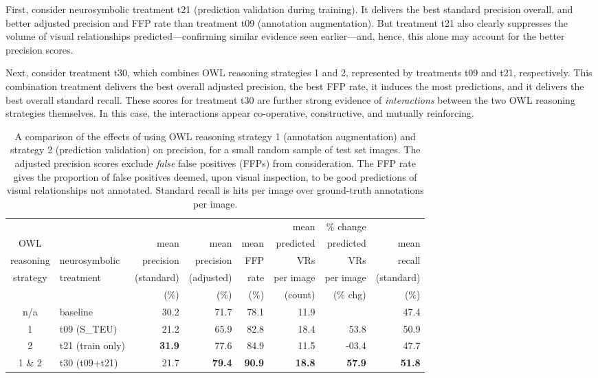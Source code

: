 \documentclass[]{jair}
\begin{document}
First, consider neurosymbolic treatment t21 (prediction validation during training).
It delivers the best standard precision overall, and better adjusted precision and FFP rate than treatment t09 (annotation augmentation).
But treatment t21 also clearly suppresses the volume of visual relationships predicted---confirming similar evidence seen earlier---and, hence, this alone may account for the better precision scores.

Next, consider treatment t30, which combines OWL reasoning strategies 1 and 2, represented by treatments t09 and t21, respectively.
This combination treatment delivers the best overall adjusted precision, the best FFP rate, it induces the most predictions, and it delivers the best overall standard recall.
These scores for treatment t30 are further strong evidence of \emph{interactions} between the two OWL reasoning strategies themselves.
In this case, the interactions appear co-operative, constructive, and mutually reinforcing.

\begin{table}[t]
  \centering
  \footnotesize
  \begin{threeparttable}
  \caption{\footnotesize A comparison of the effects of using OWL reasoning strategy 1 (annotation augmentation) and strategy 2 (prediction validation) on precision, for a small random sample of test set images. The adjusted precision scores exclude \emph{false} false positives (FFPs) from consideration. The FFP rate gives the proportion of false positives deemed, upon visual inspection, to be good predictions of visual relationships not annotated. Standard recall is hits per image over ground-truth annotations per image.}
  \label{table:manual-precision-scores-I2}
  \begin{tabular}{clrrrrrr}
    \toprule
            &       &            &            &        & mean   & \% change &   \\
    OWL     &       & mean       & mean       & mean       & predicted   & predicted & mean \\
    reasoning & neurosymbolic   & precision  & precision  &    FFP  &   VRs & VRs & recall \\
    strategy  & treatment & (standard)  & (adjusted) & rate  & per image & per image & (standard) \\
            & & (\%)   &  (\%)  & (\%) & (count) & (\% chg) & (\%) \\
    \midrule
    n/a    & baseline & 30.2  & 71.7  & 78.1 & 11.9 &  & 47.4 \\
    1 & t09 (S\_TEU) & 21.2  & 65.9  & 82.8 & 18.4 & 53.8 & 50.9 \\
    2 & t21 (train only) & \textbf{31.9}  & 77.6  & 84.9 & 11.5 & -03.4 & 47.7 \\
    1 \& 2 & t30 (t09+t21) & 21.7 & \textbf{79.4} & \textbf{90.9} & \textbf{18.8} & \textbf{57.9} & \textbf{51.8} \\
    \bottomrule 
  \end{tabular}
  \end{threeparttable}
\end{table}
\end{document}
